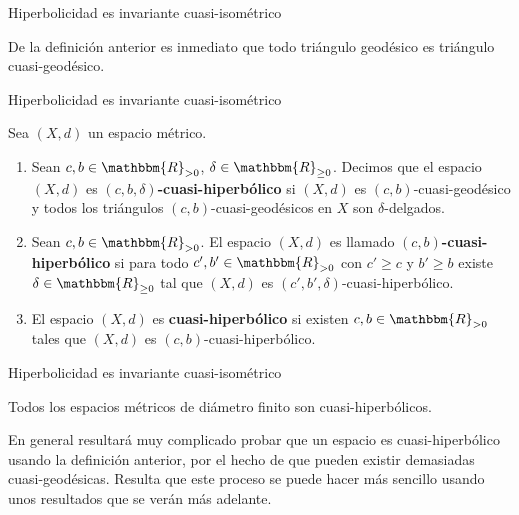 \documentclass[xcolor=dvipsnames]{beamer}
\theoremstyle{largebreak}
\newcommand{\bbm}[1]{\ensuremath{\mathbbm{#1}}}
\begin{document}
\begin{frame}{Hiperbolicidad es invariante cuasi-isométrico}
    \begin{obs}
        De la definición anterior es inmediato que todo triángulo geodésico es triángulo cuasi-geodésico.
    \end{obs}
\end{frame}

\begin{frame}{Hiperbolicidad es invariante cuasi-isométrico}
    \begin{mydef}
        Sea $(X,d)$ un espacio métrico.
        \begin{enumerate}[label = \textit{(\arabic*)}]
            \item Sean $c,b\in\bbm{R}_{>0}$, $\delta\in\bbm{R}_{\geq0}$. Decimos que el espacio $(X,d)$ es \textbf{$(c,b,\delta)$-cuasi-hiperbólico} si $(X,d)$ es $(c,b)$-cuasi-geodésico y todos los triángulos $(c,b)$-cuasi-geodésicos en $X$ son $\delta$-delgados.
            \item Sean $c,b\in\bbm{R}_{>0}$. El espacio $(X,d)$ es llamado \textbf{$(c,b)$-cuasi-hiperbólico} si para todo $c',b'\in\bbm{R}_{>0}$ con $c'\geq c$ y $b'\geq b$ existe $\delta\in\bbm{R}_{\geq0}$ tal que $(X,d)$ es $(c',b',\delta)$-cuasi-hiperbólico.
            \item El espacio $(X,d)$ es \textbf{cuasi-hiperbólico} si existen $c,b\in\bbm{R}_{>0}$ tales que $(X,d)$ es $(c,b)$-cuasi-hiperbólico.
        \end{enumerate}
    \end{mydef}
\end{frame}

\begin{frame}{Hiperbolicidad es invariante cuasi-isométrico}
    \begin{exa}
        Todos los espacios métricos de diámetro finito son cuasi-hiperbólicos.
    \end{exa}

    \begin{obs}
        En general resultará muy complicado probar que un espacio es cuasi-hiperbólico usando la definición anterior, por el hecho de que pueden existir demasiadas cuasi-geodésicas. Resulta que este proceso se puede hacer más sencillo usando unos resultados que se verán más adelante.
    \end{obs}
\end{frame}
\end{document}
